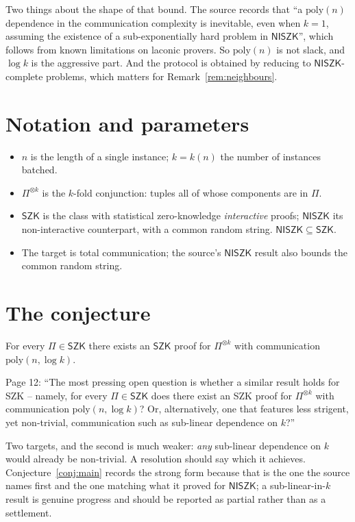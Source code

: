 \documentclass{conjura-conjecture}
\newcommand{\NISZK}{\mathsf{NISZK}}
\newcommand{\SZK}{\mathsf{SZK}}
\begin{document}
Two things about the shape of that bound. The source records that ``a
$\mathrm{poly}(n)$ dependence in the communication complexity is
inevitable, even when $k = 1$, assuming the existence of a
sub-exponentially hard problem in $\NISZK$'', which follows from known
limitations on laconic provers. So $\mathrm{poly}(n)$ is not slack, and
$\log k$ is the aggressive part. And the protocol is obtained by reducing
to $\NISZK$-complete problems, which matters for
Remark~\ref{rem:neighbours}.

\section{Notation and parameters}\label{sec:notation}

\begin{itemize}[nosep]
  \item $n$ is the length of a single instance; $k = k(n)$ the number of
    instances batched.
  \item $\Pi^{\otimes k}$ is the $k$-fold conjunction: tuples all of
    whose components are in $\Pi$.
  \item $\SZK$ is the class with statistical zero-knowledge
    \emph{interactive} proofs; $\NISZK$ its non-interactive counterpart,
    with a common random string. $\NISZK \subseteq \SZK$.
  \item The target is total communication; the source's $\NISZK$ result
    also bounds the common random string.
\end{itemize}

\section{The conjecture}\label{sec:conjectures}

\begin{conjecture}\label{conj:main}
For every $\Pi \in \SZK$ there exists an $\SZK$ proof for
$\Pi^{\otimes k}$ with communication $\mathrm{poly}(n, \log k)$.
\end{conjecture}

\begin{remark}\label{rem:framing}
Page 12: ``The most pressing open question is whether a similar result
holds for SZK -- namely, for every $\Pi \in \SZK$ does there exist an SZK
proof for $\Pi^{\otimes k}$ with communication $\mathrm{poly}(n, \log
k)$? Or, alternatively, one that features less strigent, yet non-trivial,
communication such as sub-linear dependence on $k$?''

Two targets, and the second is much weaker: \emph{any} sub-linear
dependence on $k$ would already be non-trivial. A resolution should say
which it achieves. Conjecture~\ref{conj:main} records the strong form
because that is the one the source names first and the one matching what
it proved for $\NISZK$; a sub-linear-in-$k$ result is genuine progress
and should be reported as partial rather than as a settlement.
\end{remark}
\end{document}
